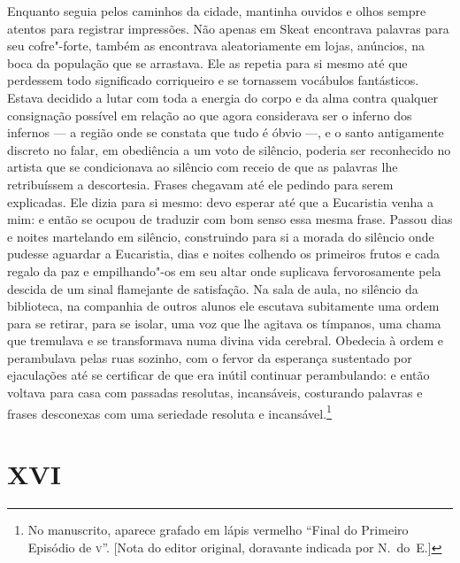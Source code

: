Enquanto seguia pelos caminhos da cidade, mantinha ouvidos e olhos
sempre atentos para registrar impressões.  Não apenas em Skeat
encontrava palavras para seu cofre"-forte, também as encontrava
aleatoriamente em lojas, anúncios, na boca da população que se
arrastava.  Ele as repetia para si mesmo até que perdessem todo
significado corriqueiro e se tornassem vocábulos fantásticos.  Estava
decidido a lutar com toda a energia do corpo e da alma contra qualquer
consignação possível em relação ao que agora considerava ser o inferno
dos infernos --- a região onde se constata que tudo é óbvio ---, e o santo
antigamente \label{discreto"-no} discreto no falar, em obediência a um voto de silêncio,
poderia ser reconhecido no artista que se condicionava ao silêncio com
receio de que as palavras lhe retribuíssem a descortesia.  Frases
chegavam até ele pedindo para serem explicadas.  Ele dizia para si
mesmo: devo esperar até que a Eucaristia venha a mim: e então se ocupou
de traduzir com bom senso essa mesma frase.  Passou dias e noites
martelando em silêncio, construindo para si a morada do silêncio onde
pudesse aguardar a Eucaristia, dias e noites colhendo os primeiros
frutos e cada regalo da paz e empilhando"-os em seu altar onde suplicava
fervorosamente pela descida de um sinal flamejante de satisfação.  Na
sala de aula, no silêncio da biblioteca, na companhia de outros alunos
ele escutava subitamente uma ordem para se retirar, para se isolar, uma
voz que lhe agitava os tímpanos, uma chama que tremulava e se
transformava numa divina vida cerebral.  Obedecia à ordem e perambulava
pelas ruas sozinho, com o fervor da esperança sustentado por
ejaculações até se certificar de que era inútil continuar perambulando:
e então voltava para casa com passadas resolutas, incansáveis,
costurando palavras e frases desconexas com uma seriedade resoluta e
incansável.\footnote{ No manuscrito, aparece grafado em lápis vermelho “Final
do Primeiro Episódio de \textsc{v}”. [Nota do editor original, doravante indicada por N.~do~E.]}


\section{XVI}

